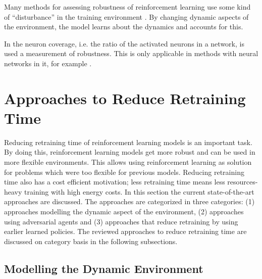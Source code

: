Many methods for assessing robustness of reinforcement learning use some kind
of ``disturbance'' in the training environment \cite{morimoto2005}. By
changing dynamic aspects of the environment, the model learns about the
dynamics and accounts for this.


In  the neuron coverage, i.e. the ratio of the activated
neurons in a network, is used a measurement of robustness. This is only
applicable in \rl methods with neural networks in it, for example \dqn.




\section{Approaches to Reduce Retraining Time}\label{sec:reduce}

Reducing retraining time of reinforcement learning models is an important
task. By doing this, reinforcement learning models get more robust
and can be used in more flexible environments. This allows using reinforcement
learning as solution for problems which were too flexible for previous
\rl models. Reducing retraining time also has a cost efficient motivation;
less retraining time means less resources-heavy training with high energy
costs. In this section the current state-of-the-art approaches are discussed.
The approaches are categorized in three categories: (1) approaches modelling
the dynamic aspect of the environment, (2) approaches using adversarial agents
and (3) approaches that reduce retraining by using earlier learned policies.
The reviewed approaches to reduce retraining time are discussed on category
basis in the following subsections.


\subsection{Modelling the Dynamic Environment}\label{sec:model}

